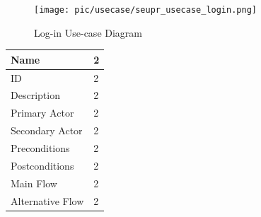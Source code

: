 \documentclass[12pt]{report} %
\begin{document}
\ifx

\begin{center}
\begin{figure}[h]
	\begin{center}
	\texttt{[image: pic/usecase/seupr\_usecase\_login.png]}
	\end{center}
	\caption{Log-in Use-case Diagram}
	\label{fig:seupr_usecase_login}
\end{figure}
\end{center}

\fi


\ifx

\begin{tabular}{|l|l|}
\hline
 Name & 2 \\
\hline
 ID & 2 \\
 \hline
 Description & 2 \\
\hline
 Primary Actor & 2 \\
 \hline
 Secondary Actor & 2 \\
\hline
 Preconditions & 2 \\
 \hline
 Postconditions & 2 \\
\hline
 Main Flow & 2 \\
 \hline
 Alternative Flow & 2 \\
\hline
 
\end{tabular}
\fi


\ifx
\end{document}
